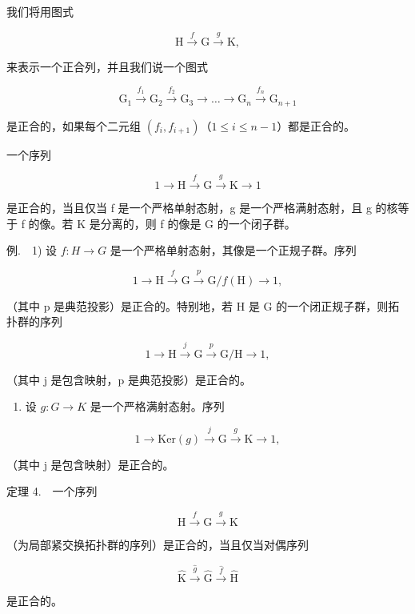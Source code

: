 我们将用图式

\[
\mathrm{H} \xrightarrow {f} \mathrm{G} \xrightarrow {g} \mathrm{K},
\]

来表示一个正合列，并且我们说一个图式

\[
\mathrm{G} _ {1} \xrightarrow {f _ {1}} \mathrm{G} _ {2} \xrightarrow {f _ {2}} \mathrm{G} _ {3} \rightarrow \dots \rightarrow \mathrm{G} _ {n} \xrightarrow {f _ {n}} \mathrm{G} _ {n + 1}
\]

是正合的，如果每个二元组 \((f_i, f_{i+1})\)（\(1 \leqslant i \leqslant n-1\)）都是正合的。

一个序列

\[
1 \to \mathrm{H} \xrightarrow {f} \mathrm{G} \xrightarrow {g} \mathrm{K} \to 1
\]

是正合的，当且仅当 f 是一个严格单射态射，g 是一个严格满射态射，且 g 的核等于 f 的像。若 K 是分离的，则 f 的像是 G 的一个闭子群。

例.　1) 设 \(f\colon H \to G\) 是一个严格单射态射，其像是一个正规子群。序列

\[
1 \to \mathrm{H} \xrightarrow {f} \mathrm{G} \xrightarrow {p} \mathrm{G} / f (\mathrm{H}) \to 1,
\]

（其中 p 是典范投影）是正合的。特别地，若 H 是 G 的一个闭正规子群，则拓扑群的序列

\[
1 \to \mathrm{H} \xrightarrow {j} \mathrm{G} \xrightarrow {p} \mathrm{G} / \mathrm{H} \to 1,
\]

（其中 j 是包含映射，p 是典范投影）是正合的。

\begin{enumerate}
\def\labelenumi{\arabic{enumi})}
\setcounter{enumi}{1}
\tightlist
\item
  设 \(g: G \rightarrow K\) 是一个严格满射态射。序列
\end{enumerate}

\[
1 \to \mathrm{Ker} (g) \stackrel {j} {\longrightarrow} \mathrm{G} \stackrel {g} {\longrightarrow} \mathrm{K} \to 1,
\]

（其中 j 是包含映射）是正合的。

定理 4.　一个序列

\[
\mathrm{H} \xrightarrow {f} \mathrm{G} \xrightarrow {g} \mathrm{K}
\]

（为局部紧交换拓扑群的序列）是正合的，当且仅当对偶序列

\[
\widehat {\mathrm{K}} \xrightarrow {\widehat {g}} \widehat {\mathrm{G}} \xrightarrow {\widehat {f}} \widehat {\mathrm{H}}
\]

是正合的。


